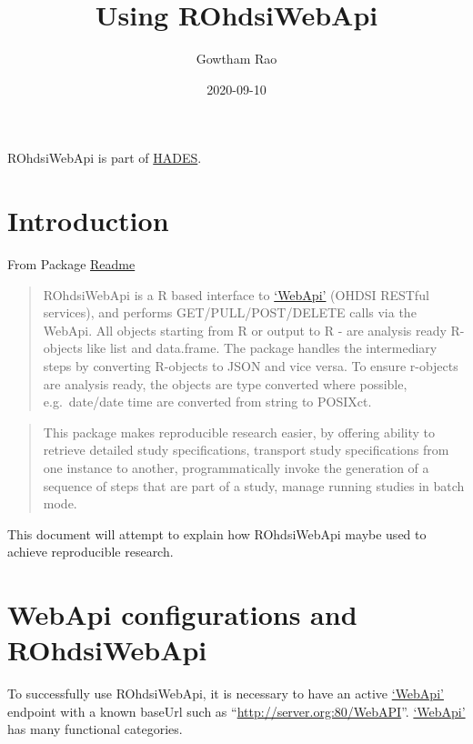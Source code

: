 \documentclass[
]{article}
\title{Using ROhdsiWebApi}
\author{Gowtham Rao}
\date{2020-09-10}
\begin{document}
\maketitle

{
\setcounter{tocdepth}{2}
\tableofcontents
}
ROhdsiWebApi is part of \href{https://ohdsi.github.io/Hades}{HADES}.

\hypertarget{introduction}{%
\section{Introduction}\label{introduction}}

From Package
\href{https://github.com/OHDSI/ROhdsiWebApi/blob/master/README.md}{Readme}

\begin{quote}
ROhdsiWebApi is a R based interface to
\href{https://github.com/ohdsi/webapi}{`WebApi'} (OHDSI RESTful
services), and performs GET/PULL/POST/DELETE calls via the WebApi. All
objects starting from R or output to R - are analysis ready R-objects
like list and data.frame. The package handles the intermediary steps by
converting R-objects to JSON and vice versa. To ensure r-objects are
analysis ready, the objects are type converted where possible,
e.g.~date/date time are converted from string to POSIXct.
\end{quote}

\begin{quote}
This package makes reproducible research easier, by offering ability to
retrieve detailed study specifications, transport study specifications
from one instance to another, programmatically invoke the generation of
a sequence of steps that are part of a study, manage running studies in
batch mode.
\end{quote}

This document will attempt to explain how ROhdsiWebApi maybe used to
achieve reproducible research.

\hypertarget{webapi-configurations-and-rohdsiwebapi}{%
\section{WebApi configurations and
ROhdsiWebApi}\label{webapi-configurations-and-rohdsiwebapi}}

To successfully use ROhdsiWebApi, it is necessary to have an active
\href{https://github.com/ohdsi/webapi}{`WebApi'} endpoint with a known
baseUrl such as ``\url{http://server.org:80/WebAPI}''.
\href{https://github.com/ohdsi/webapi}{`WebApi'} has many functional
categories.
\end{document}
